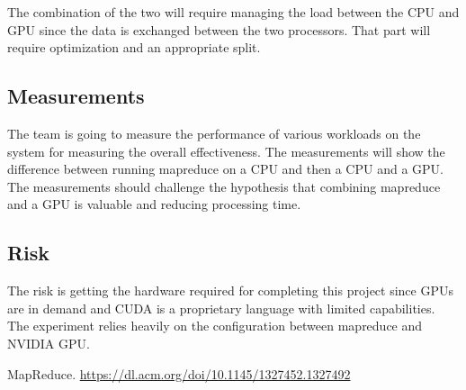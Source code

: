 \documentclass{article}
\begin{document}
The combination of the two will require managing the load between the CPU and GPU since the data is exchanged between the two processors. That part will require optimization and an appropriate split.

\subsection{Measurements}
The team is going to measure the performance of various workloads on the system for measuring the overall effectiveness. The measurements will show the difference between running mapreduce on a CPU and then a CPU and a GPU. The measurements should challenge the hypothesis that combining mapreduce and a GPU is valuable and reducing processing time. 

\subsection{Risk}
The risk is getting the hardware required for completing this project since GPUs are in demand and CUDA is a proprietary language with limited capabilities. The experiment relies heavily on the configuration between mapreduce and NVIDIA GPU. 

\begin{thebibliography}{}
\raggedright

MapReduce.
\href{https://dl.acm.org/doi/10.1145/1327452.1327492}{https://dl.acm.org/doi/10.1145/1327452.1327492}

\end{thebibliography}
\end{document}
